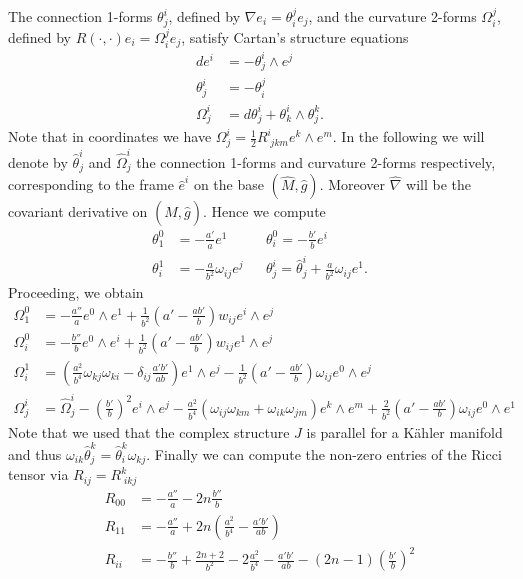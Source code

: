 \documentclass{amsart}
\theoremstyle{definition}
\theoremstyle{remark}
\numberwithin{equation}{section}
\begin{document}
The connection 1-forms $\theta^i_j$, defined by $\nabla e_i = \theta^j_i e_j$, and the curvature 2-forms $\Omega^j_i$, defined by $R(\cdot, \cdot)e_i = \Omega^j_i e_j$, satisfy Cartan's structure equations
\begin{align*}
de^i &= - \theta^i_j \wedge e^j \\
\theta^i_j &= - \theta^j_i\\
\Omega^i_j &= d\theta^i_j + \theta^i_k \wedge \theta^k_j.
\end{align*}
Note that in coordinates we have $\Omega^i_j = \frac{1}{2} R^i_{\;jkm} e^k\wedge e^m$. In the following we will denote by $\hat{\theta}^i_j$ and $\hat{\Omega}^i_j$ the connection 1-forms and curvature 2-forms respectively, corresponding to the frame $\hat{e}^i$ on the base $(\hat{M}, \hat{g})$. Moreover $\hat{\nabla}$ will be the covariant derivative on $(\hat{M}, \hat{g})$. Hence we compute
\begin{align*}
\theta^0_1 &= -\frac{a'}{a} e^1 && \theta^0_i = -\frac{b'}{b} e^i \\
\theta^1_i &= - \frac{a}{b^2} \omega_{ij} e^j && \theta^i_j = \hat{\theta}^i_j + \frac{a}{b^2} \omega_{ij} e^1.
\end{align*}
Proceeding, we obtain
\begin{align*}
\nonumber \Omega^0_1 &= -\frac{a''}{a} e^0 \wedge e^1 + \frac{1}{b^2}\left(a' - \frac{ab'}{b}\right) w_{ij} e^i\wedge e^j \\
\nonumber \Omega^0_i &= - \frac{b''}{b} e^0 \wedge e^i + \frac{1}{b^2}\left(a' - \frac{ab'}{b}\right) w_{ij}e^1 \wedge e^j \\
\nonumber\Omega^1_i &= \left(\frac{a^2}{b^4} \omega_{kj}\omega_{ki} - \delta_{ij} \frac{a'b'}{ab}\right) e^1\wedge e^j - \frac{1}{b^2} \left(a' - \frac{ab'}{b}\right) \omega_{ij} e^0\wedge e^j \\
\nonumber\Omega^i_j &= \hat{\Omega}^i_j - \left(\frac{b'}{b}\right)^2 e^i \wedge e^j - \frac{a^2}{b^4}\left( \omega_{ij}\omega_{km} + \omega_{ik} \omega_{jm} \right) e^k \wedge e^m +\frac{2}{b^2}\left( a' - \frac{ab'}{b} \right)\omega_{ij} e^0 \wedge e^1 
\end{align*}
Note that we used that the complex structure $J$ is parallel for a K\"ahler manifold and thus $\omega_{ik}\hat{\theta}^k_j = \hat{\theta}^k_i \omega_{kj}$. Finally we can compute the non-zero entries of the Ricci tensor via $R_{ij} = R^k_{\;ikj}$
\begin{align*}
R_{00} &= - \frac{a''}{a} - 2n \frac{b''}{b} \\
R_{11} &= - \frac{a''}{a} + 2n\left(\frac{a^2}{b^4} - \frac{a'b'}{ab}\right) \\
R_{ii} &= - \frac{b''}{b} + \frac{2n+2}{b^2}- 2\frac{a^2}{b^4} - \frac{a'b'}{ab} - (2n-1)\left(\frac{b'}{b}\right)^2 
\end{align*}
\end{document}
